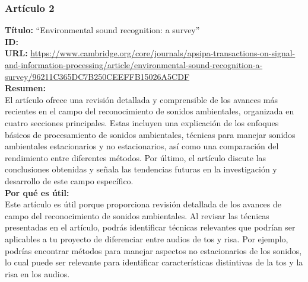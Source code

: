 \subsubsection*{Artículo 2}
    \textbf{Título:}
    “Environmental sound recognition: a survey”
    \\
    \textbf{ID: \cite{chachada2014environmental}}
    \\
    \textbf{URL:}
    \url{https://www.cambridge.org/core/journals/apsipa-transactions-on-signal-and-information-processing/article/environmental-sound-recognition-a-survey/96211C365DC7B250CEEFFB15026A5CDF}
    \\
    \textbf{Resumen:\\}
    El artículo ofrece una revisión detallada y comprensible de los avances más recientes en el campo del reconocimiento de sonidos ambientales, organizada en cuatro secciones principales. Estas incluyen una explicación de los enfoques básicos de procesamiento de sonidos ambientales, técnicas para manejar sonidos ambientales estacionarios y no estacionarios, así como una comparación del rendimiento entre diferentes métodos. Por último, el artículo discute las conclusiones obtenidas y señala las tendencias futuras en la investigación y desarrollo de este campo específico.
    \\
    \textbf{Por qué es útil:\\}
    Este artículo es útil porque proporciona revisión detallada de los avances de campo del reconocimiento de sonidos ambientales. Al revisar las técnicas presentadas en el artículo, podrás identificar técnicas relevantes que podrían ser aplicables a tu proyecto de diferenciar entre audios de tos y risa. Por ejemplo, podrías encontrar métodos para manejar aspectos no estacionarios de los sonidos, lo cual puede ser relevante para identificar características distintivas de la tos y la risa en los audios.
